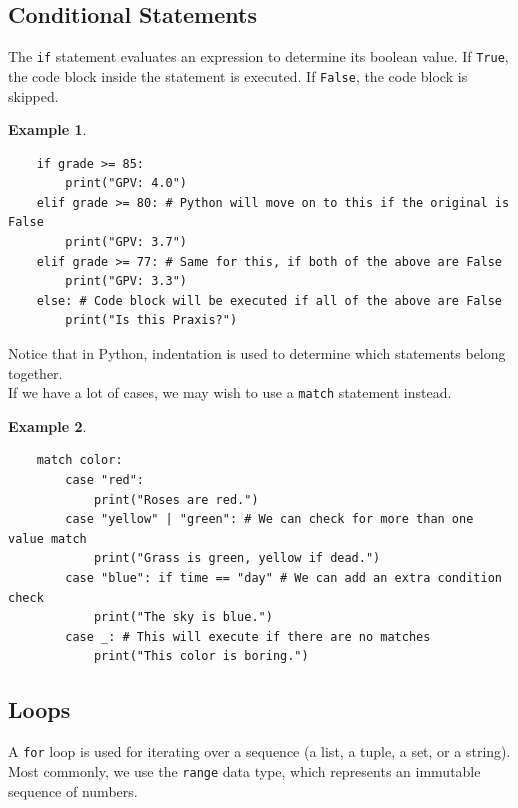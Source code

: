 \documentclass[11pt]{scrartcl}
\theoremstyle{definition}
\newtheorem*{example}{Example}
\begin{document}
\subsection{Conditional Statements}

The \texttt{if} statement evaluates an expression to determine its boolean value. If 
\texttt{True}, the code block inside the statement is executed. If \texttt{False}, the 
code block is skipped.

\begin{example}
    \
\begin{verbatim}
    if grade >= 85:
        print("GPV: 4.0")
    elif grade >= 80: # Python will move on to this if the original is False
        print("GPV: 3.7")
    elif grade >= 77: # Same for this, if both of the above are False
        print("GPV: 3.3")
    else: # Code block will be executed if all of the above are False
        print("Is this Praxis?")
\end{verbatim}
\end{example}

Notice that in Python, indentation is used to determine which statements belong together. \\

If we have a lot of cases, we may wish to use a \texttt{match} statement instead.

\begin{example}
    \
\begin{verbatim}
    match color:
        case "red":
            print("Roses are red.")
        case "yellow" | "green": # We can check for more than one value match
            print("Grass is green, yellow if dead.")
        case "blue": if time == "day" # We can add an extra condition check
            print("The sky is blue.")
        case _: # This will execute if there are no matches
            print("This color is boring.")
\end{verbatim}
\end{example}

\subsection{Loops}

A \texttt{for} loop is used for iterating over a sequence (a list, a tuple, a set, or a string).
Most commonly, we use the \texttt{range} data type, which represents an immutable sequence of 
numbers.
\end{document}
